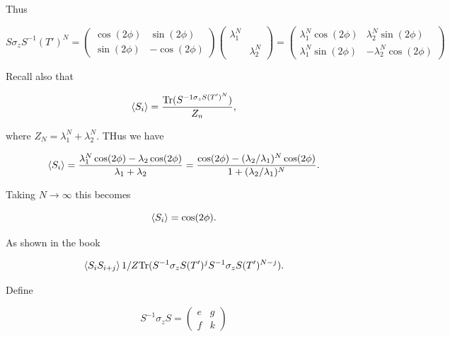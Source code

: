 \documentclass[12pt]{article}
\numberwithin{equation}{section}
\begin{document}
Thus 

\begin{equation}
    S\sigma_zS^{-1}(T')^N = \left(\begin{matrix}
        \cos(2\phi) & \sin(2\phi) \\
        \sin(2\phi) & -\cos(2\phi)
    \end{matrix}\right) \left(\begin{matrix}\lambda_1^N & \\ & \lambda_2^N\end{matrix}\right) = \left(\begin{matrix}
        \lambda_1^N\cos(2\phi) & \lambda_2^N\sin(2\phi) \\
        \lambda_1^N\sin(2\phi) & -\lambda_2^N\cos(2\phi)
    \end{matrix}\right) 
\end{equation}

Recall also that 

\begin{equation}
    \expval{S_i} = \frac{\text{Tr}(S^{-1\sigma_zS(T')^N})}{Z_n},
\end{equation}

where $Z_N = \lambda_1^N + \lambda_2^N$. THus we have 

\begin{equation}
    \expval{S_i} = \frac{\lambda_1^N \cos(2\phi) - \lambda_2\cos(2\phi)}{\lambda_1 + \lambda_2} = \frac{\cos(2\phi) - (\lambda_2/\lambda_1)^N\cos(2\phi)}{1 +  (\lambda_2/\lambda_1)^N}.
\end{equation}

Taking $N \to \infty$ this becomes 

\begin{equation}
    \expval{S_i} = \cos(2\phi).
\end{equation}

As shown in the book 

\begin{equation}
    \expval{S_i S_{i+j}} 1 /Z \text{Tr}(S^{-1}\sigma_zS(T')^j S^{-1}\sigma_z S(T')^{N-j}).
\end{equation}

Define 

\begin{equation}
    S^{-1}\sigma_z S = \left(\begin{matrix}
        e & g \\ f & k
    \end{matrix}\right)
\end{equation}
\end{document}
